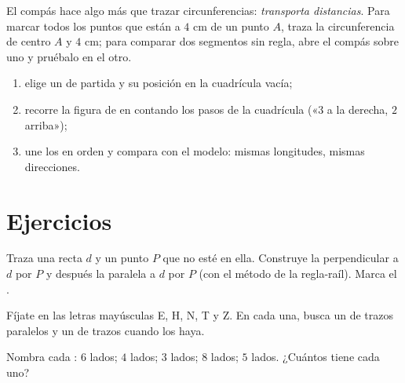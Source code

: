 \begin{example}\label{ex:g4:geometry:compass}
El compás hace algo más que trazar circunferencias: \emph{transporta
distancias}. Para marcar todos los puntos que están a $4$ cm de un punto $A$, traza la
circunferencia de centro $A$ y  $4$ cm; para comparar dos segmentos sin
regla, abre el compás sobre uno y pruébalo en el otro.
\end{example}

\begin{method}\label{met:g4:geometry:reproduce}
\begin{enumerate}
  \item elige un  de partida y su posición en la cuadrícula vacía;
  \item recorre la figura de  en  contando los pasos
        de la cuadrícula («$3$ a la derecha, $2$ arriba»);
  \item une los  en orden y compara con el modelo:
        mismas longitudes, mismas direcciones.
\end{enumerate}
\end{method}

\section{Ejercicios}

\begin{exercise}[$\star$]\label{exo:g4:geometry:1}
Traza una recta $d$ y un punto $P$ que no esté en ella. Construye la
perpendicular a $d$ por $P$ y después la paralela a $d$ por
$P$ (con el método de la regla-raíl). Marca el .
\end{exercise}

\begin{exercise}[$\star$]\label{exo:g4:geometry:2}
Fíjate en las letras mayúsculas E, H, N, T y Z. En cada una, busca un  de
trazos paralelos y un  de trazos  cuando los
haya.
\end{exercise}

\begin{exercise}[$\star$]\label{exo:g4:geometry:3}
Nombra cada : $6$ lados; $4$ lados; $3$ lados; $8$ lados;
$5$ lados. ¿Cuántos \emph{} tiene cada uno?
\end{exercise}

